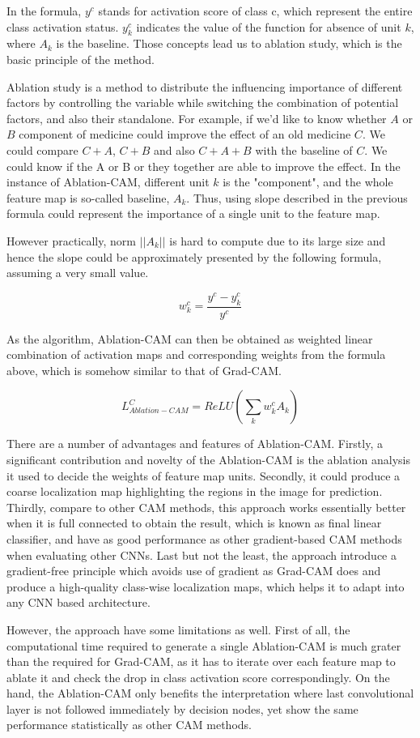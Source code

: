 \documentclass[conference]{IEEEtran}
\begin{document}
In the formula, $y^c$ stands for activation score of class c, which represent the entire class activation status. $y^c_k$ indicates the value of the function for absence of unit $k$, where $A_k$ is the baseline. Those concepts lead us to ablation study, which is the basic principle of the method.\par
Ablation study is a method to distribute the influencing importance of different factors by controlling the variable while switching the combination of potential factors, and also their standalone. For example, if we'd like to know whether $A$ or $B$ component of medicine could improve the effect of an old medicine $C$. We could compare $C+A$, $C+B$ and also $C+A+B$ with the baseline of $C$. We could know if the A or B or they together are able to improve the effect. In the instance of Ablation-CAM, different unit $k$ is the "component", and the whole feature map is so-called baseline, $A_k$. Thus, using slope described in the previous formula could represent the importance of a single unit to the feature map.\par
However practically, norm $||A_k||$ is hard to compute due to its large size and hence the slope could be approximately presented by the following formula, assuming a very small value.

$$w^c_k = \frac{y^c-y^c_k}{y^c}$$

As the algorithm, Ablation-CAM can then be obtained as weighted linear combination of activation maps and corresponding weights from the formula above, which is somehow similar to that of Grad-CAM.

$$L^C_{Ablation-CAM}=ReLU(\sum_k {w^c_k}{A_k})$$

There are a number of advantages and features of Ablation-CAM. Firstly, a significant contribution and novelty of the Ablation-CAM is the ablation analysis it used to decide the weights of feature map units. Secondly, it could produce a coarse localization map highlighting the regions in the image for prediction. Thirdly, compare to other CAM methods, this approach works essentially better when it is full connected to obtain the result, which is known as final linear classifier, and have as good performance as other gradient-based CAM methods when evaluating other CNNs. Last but not the least, the approach introduce a gradient-free principle which avoids use of gradient as Grad-CAM does and produce a high-quality class-wise localization maps, which helps it to adapt into any CNN based architecture.\par
However, the approach have some limitations as well. First of all, the computational time required to generate a single Ablation-CAM is much grater than the required for Grad-CAM, as it has to iterate over each feature map to ablate it and check the drop in class activation score correspondingly. 
On the hand, the Ablation-CAM only benefits the interpretation where last convolutional layer is not followed immediately by decision nodes, yet show the same performance statistically as other CAM methods.\par
\end{document}
